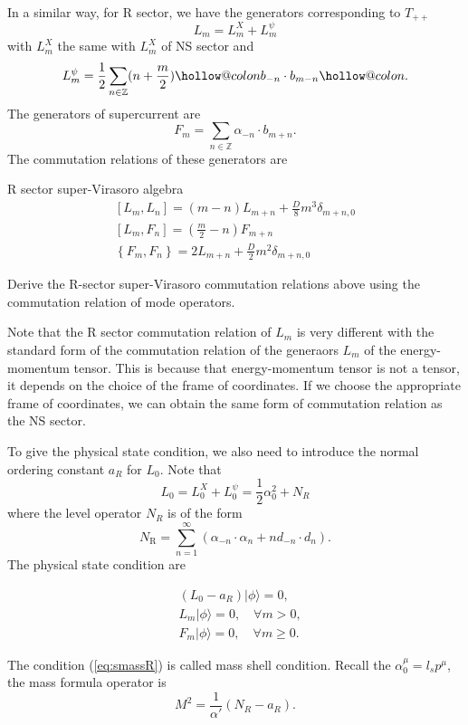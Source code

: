 \documentclass[graybox,envcountchap,sectrefs]{svmono}
\makeatletter
\newcommand{\hollowcolon}{\mathpalette\hollow@colon\relax}
\newcommand{\hollow@colon}[2]{%
  \mspace{1mu}%
  \vbox{%
    \hbox{$\m@th#1\smallcirc$}
    \nointerlineskip
    \kern.45ex
    \hbox{$\m@th#1\smallcirc$}
    \kern-.06ex
  }%
  \mspace{1mu}%
}
\newcommand{\hcolondel}[1]{%
  \mathopen{\hollowcolon}#1\mathclose{\hollowcolon}%
}
\makeatother
\begin{document}
In a similar way, for R sector, we have the generators corresponding to $T_{++}$
\begin{equation}
L_m=L_m^X+L_m^{\psi}	
\end{equation}
with $L_m^X$ the same with $L_m^X$ of NS sector and
\begin{equation}
L_m^{\psi}=\frac{1}{2}\sum_{n\in \mathbb{Z}}(n+\frac{m}{2})\hcolondel{ b_{-n}\cdot b_{m-n}	}.
\end{equation}
The generators of supercurrent are
\begin{equation}
F_m=\sum_{n\in \mathbb{Z}}\alpha_{-n}\cdot b_{m+n}.	
\end{equation}
The commutation relations of these generators are
\begin{svgraybox}
R sector super-Virasoro algebra
\begin{align}
{\left[L_{m}, L_{n}\right]=(m-n) L_{m+n}+\frac{D}{8} m^{3} \delta_{m+n, 0}} \\
{\left[L_{m}, F_{n}\right]=\left(\frac{m}{2}-n\right) F_{m+n}} \\
\left\{F_{m}, F_{n}\right\}=2 L_{m+n}+\frac{D}{2} m^{2} \delta_{m+n, 0} \label{eq:VF}
\end{align}	
\end{svgraybox}
\begin{exercise}
Derive the R-sector super-Virasoro commutation relations above using the commutation relation of mode operators.
\end{exercise}
Note that the R sector commutation relation of $L_{m}$ is very different with the standard form of the commutation relation of the generaors $L_m$ of the energy-momentum tensor. This is because that energy-momentum tensor is not a tensor, it depends on the choice of the frame of coordinates. If we choose the appropriate frame of coordinates, we can obtain the same form of commutation relation as the NS sector.


To give the physical state condition, we also need to introduce the normal ordering constant $a_R$ for $L_0$. Note that
\begin{equation}
L_0=L_0^X+L_0^{\psi}=\frac{1}{2}\alpha_0^2+N	_{R}
\end{equation}
where the level operator $N_{R}$ is of the form
\begin{equation}
N_{\mathrm{R}}=\sum_{n=1}^{\infty}\left(\alpha_{-n} \cdot \alpha_{n}+n d_{-n} \cdot d_{n}\right).
\end{equation}
The physical state condition are
\begin{svgraybox}
\begin{align}
&(L_0-a_{R})	|\phi\rangle =0, \label{eq:smassR}\\
&L_m |\phi\rangle =0,\quad \forall m>0,\\
&F_{m}|\phi\rangle =0,\quad  \forall m\geq 0.	
\end{align}
\end{svgraybox}
The condition (\ref{eq:smassR}) is called mass shell condition.
Recall the $\alpha_0^{\mu}=l_sp^{\mu}$, the mass formula operator is
\begin{equation}
M^2=\frac{1}{\alpha'}(N_{R}-a_{R})	.
\end{equation}
\end{document}
